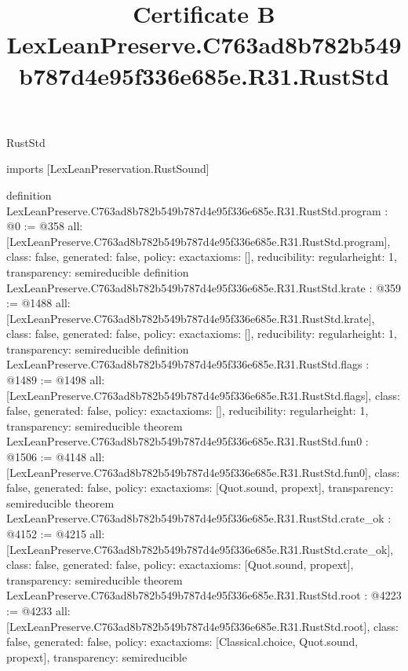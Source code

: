 \begin{lexlean}{RustStd}
\title{Certificate B LexLeanPreserve.C763ad8b782b549b787d4e95f336e685e.R31.RustStd}
\begin{coremodule}
imports [LexLeanPreservation.RustSound]

definition LexLeanPreserve.C763ad8b782b549b787d4e95f336e685e.R31.RustStd.program : @0 := @358 {
  all: [LexLeanPreserve.C763ad8b782b549b787d4e95f336e685e.R31.RustStd.program],
  class: false,
  generated: false,
  policy: exact{axioms: []},
  reducibility: regular{height: 1},
  transparency: semireducible
}
definition LexLeanPreserve.C763ad8b782b549b787d4e95f336e685e.R31.RustStd.krate : @359 := @1488 {
  all: [LexLeanPreserve.C763ad8b782b549b787d4e95f336e685e.R31.RustStd.krate],
  class: false,
  generated: false,
  policy: exact{axioms: []},
  reducibility: regular{height: 1},
  transparency: semireducible
}
definition LexLeanPreserve.C763ad8b782b549b787d4e95f336e685e.R31.RustStd.flags : @1489 := @1498 {
  all: [LexLeanPreserve.C763ad8b782b549b787d4e95f336e685e.R31.RustStd.flags],
  class: false,
  generated: false,
  policy: exact{axioms: []},
  reducibility: regular{height: 1},
  transparency: semireducible
}
theorem LexLeanPreserve.C763ad8b782b549b787d4e95f336e685e.R31.RustStd.fun0 : @1506 := @4148 {
  all: [LexLeanPreserve.C763ad8b782b549b787d4e95f336e685e.R31.RustStd.fun0],
  class: false,
  generated: false,
  policy: exact{axioms: [Quot.sound, propext]},
  transparency: semireducible
}
theorem LexLeanPreserve.C763ad8b782b549b787d4e95f336e685e.R31.RustStd.crate_ok : @4152 := @4215 {
  all: [LexLeanPreserve.C763ad8b782b549b787d4e95f336e685e.R31.RustStd.crate_ok],
  class: false,
  generated: false,
  policy: exact{axioms: [Quot.sound, propext]},
  transparency: semireducible
}
theorem LexLeanPreserve.C763ad8b782b549b787d4e95f336e685e.R31.RustStd.root : @4223 := @4233 {
  all: [LexLeanPreserve.C763ad8b782b549b787d4e95f336e685e.R31.RustStd.root],
  class: false,
  generated: false,
  policy: exact{axioms: [Classical.choice, Quot.sound, propext]},
  transparency: semireducible
}


\end{coremodule}
\end{lexlean}
